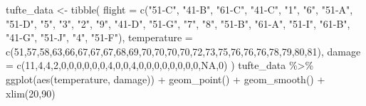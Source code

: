 \documentclass[
]{article}
\newenvironment{Shaded}{\begin{snugshade}}{\end{snugshade}}
\newcommand{\AttributeTok}[1]{\textcolor[rgb]{0.77,0.63,0.00}{#1}}
\newcommand{\ConstantTok}[1]{\textcolor[rgb]{0.00,0.00,0.00}{#1}}
\newcommand{\DecValTok}[1]{\textcolor[rgb]{0.00,0.00,0.81}{#1}}
\newcommand{\FunctionTok}[1]{\textcolor[rgb]{0.00,0.00,0.00}{#1}}
\newcommand{\NormalTok}[1]{#1}
\newcommand{\OtherTok}[1]{\textcolor[rgb]{0.56,0.35,0.01}{#1}}
\newcommand{\SpecialCharTok}[1]{\textcolor[rgb]{0.00,0.00,0.00}{#1}}
\newcommand{\StringTok}[1]{\textcolor[rgb]{0.31,0.60,0.02}{#1}}
\theoremstyle{definition}
\theoremstyle{definition}
\theoremstyle{definition}
\theoremstyle{definition}
\theoremstyle{remark}
\begin{document}
\begin{Shaded}
\begin{Highlighting}[]
\NormalTok{tufte\_data }\OtherTok{\textless{}{-}} \FunctionTok{tibble}\NormalTok{(}
  \AttributeTok{flight =} \FunctionTok{c}\NormalTok{(}\StringTok{"51{-}C"}\NormalTok{, }\StringTok{"41{-}B"}\NormalTok{, }\StringTok{"61{-}C"}\NormalTok{, }\StringTok{"41{-}C"}\NormalTok{, }\StringTok{"1"}\NormalTok{, }\StringTok{"6"}\NormalTok{, }\StringTok{"51{-}A"}\NormalTok{, }\StringTok{"51{-}D"}\NormalTok{, }\StringTok{"5"}\NormalTok{, }\StringTok{"3"}\NormalTok{, }\StringTok{"2"}\NormalTok{, }\StringTok{"9"}\NormalTok{, }\StringTok{"41{-}D"}\NormalTok{, }\StringTok{"51{-}G"}\NormalTok{, }\StringTok{"7"}\NormalTok{, }\StringTok{"8"}\NormalTok{, }\StringTok{"51{-}B"}\NormalTok{, }\StringTok{"61{-}A"}\NormalTok{, }\StringTok{"51{-}I"}\NormalTok{, }\StringTok{"61{-}B"}\NormalTok{, }\StringTok{"41{-}G"}\NormalTok{, }\StringTok{"51{-}J"}\NormalTok{, }\StringTok{"4"}\NormalTok{, }\StringTok{"51{-}F"}\NormalTok{),}
  \AttributeTok{temperature =} \FunctionTok{c}\NormalTok{(}\DecValTok{51}\NormalTok{,}\DecValTok{57}\NormalTok{,}\DecValTok{58}\NormalTok{,}\DecValTok{63}\NormalTok{,}\DecValTok{66}\NormalTok{,}\DecValTok{67}\NormalTok{,}\DecValTok{67}\NormalTok{,}\DecValTok{67}\NormalTok{,}\DecValTok{68}\NormalTok{,}\DecValTok{69}\NormalTok{,}\DecValTok{70}\NormalTok{,}\DecValTok{70}\NormalTok{,}\DecValTok{70}\NormalTok{,}\DecValTok{70}\NormalTok{,}\DecValTok{72}\NormalTok{,}\DecValTok{73}\NormalTok{,}\DecValTok{75}\NormalTok{,}\DecValTok{76}\NormalTok{,}\DecValTok{76}\NormalTok{,}\DecValTok{76}\NormalTok{,}\DecValTok{78}\NormalTok{,}\DecValTok{79}\NormalTok{,}\DecValTok{80}\NormalTok{,}\DecValTok{81}\NormalTok{),}
  \AttributeTok{damage =} \FunctionTok{c}\NormalTok{(}\DecValTok{11}\NormalTok{,}\DecValTok{4}\NormalTok{,}\DecValTok{4}\NormalTok{,}\DecValTok{2}\NormalTok{,}\DecValTok{0}\NormalTok{,}\DecValTok{0}\NormalTok{,}\DecValTok{0}\NormalTok{,}\DecValTok{0}\NormalTok{,}\DecValTok{0}\NormalTok{,}\DecValTok{0}\NormalTok{,}\DecValTok{4}\NormalTok{,}\DecValTok{0}\NormalTok{,}\DecValTok{0}\NormalTok{,}\DecValTok{4}\NormalTok{,}\DecValTok{0}\NormalTok{,}\DecValTok{0}\NormalTok{,}\DecValTok{0}\NormalTok{,}\DecValTok{0}\NormalTok{,}\DecValTok{0}\NormalTok{,}\DecValTok{0}\NormalTok{,}\DecValTok{0}\NormalTok{,}\DecValTok{0}\NormalTok{,}\ConstantTok{NA}\NormalTok{,}\DecValTok{0}\NormalTok{)}
\NormalTok{)}
\NormalTok{tufte\_data }\SpecialCharTok{\%\textgreater{}\%}
  \FunctionTok{ggplot}\NormalTok{(}\FunctionTok{aes}\NormalTok{(temperature, damage)) }\SpecialCharTok{+}
  \FunctionTok{geom\_point}\NormalTok{() }\SpecialCharTok{+}
  \FunctionTok{geom\_smooth}\NormalTok{() }\SpecialCharTok{+}
  \FunctionTok{xlim}\NormalTok{(}\DecValTok{20}\NormalTok{,}\DecValTok{90}\NormalTok{)}
\end{Highlighting}
\end{Shaded}
\end{document}
